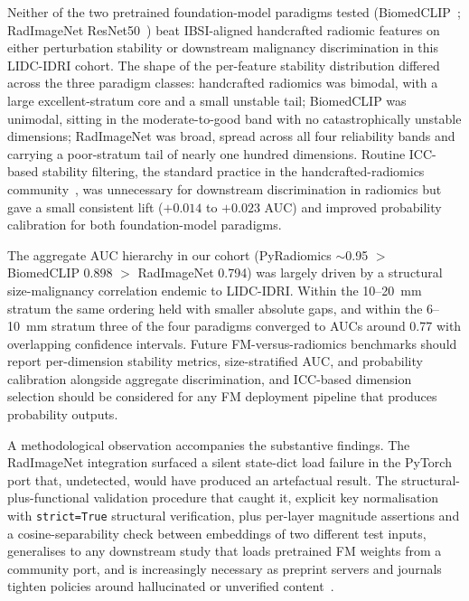 
Neither of the two pretrained foundation-model paradigms tested (BiomedCLIP~\cite{zhang2024biomedclip}; RadImageNet ResNet50~\cite{mei2022radimagenet}) beat IBSI-aligned handcrafted radiomic features on either perturbation stability or downstream malignancy discrimination in this LIDC-IDRI cohort. The shape of the per-feature stability distribution differed across the three paradigm classes: handcrafted radiomics was bimodal, with a large excellent-stratum core and a small unstable tail; BiomedCLIP was unimodal, sitting in the moderate-to-good band with no catastrophically unstable dimensions; RadImageNet was broad, spread across all four reliability bands and carrying a poor-stratum tail of nearly one hundred dimensions. Routine ICC-based stability filtering, the standard practice in the handcrafted-radiomics community~\cite{pavic2018,vantimmeren2020}, was unnecessary for downstream discrimination in radiomics but gave a small consistent lift ($+0.014$ to $+0.023$ AUC) and improved probability calibration for both foundation-model paradigms.

The aggregate AUC hierarchy in our cohort (PyRadiomics $\sim$0.95 $>$ BiomedCLIP 0.898 $>$ RadImageNet 0.794) was largely driven by a structural size-malignancy correlation endemic to LIDC-IDRI. Within the 10--20~mm stratum the same ordering held with smaller absolute gaps, and within the 6--10~mm stratum three of the four paradigms converged to AUCs around 0.77 with overlapping confidence intervals. Future FM-versus-radiomics benchmarks should report per-dimension stability metrics, size-stratified AUC, and probability calibration alongside aggregate discrimination, and ICC-based dimension selection should be considered for any FM deployment pipeline that produces probability outputs.

A methodological observation accompanies the substantive findings. The RadImageNet integration surfaced a silent state-dict load failure in the PyTorch port that, undetected, would have produced an artefactual result. The structural-plus-functional validation procedure that caught it, explicit key normalisation with \texttt{strict=True} structural verification, plus per-layer magnitude assertions and a cosine-separability check between embeddings of two different test inputs, generalises to any downstream study that loads pretrained FM weights from a community port, and is increasingly necessary as preprint servers and journals tighten policies around hallucinated or unverified content~\cite{singh2026arxiv}.
